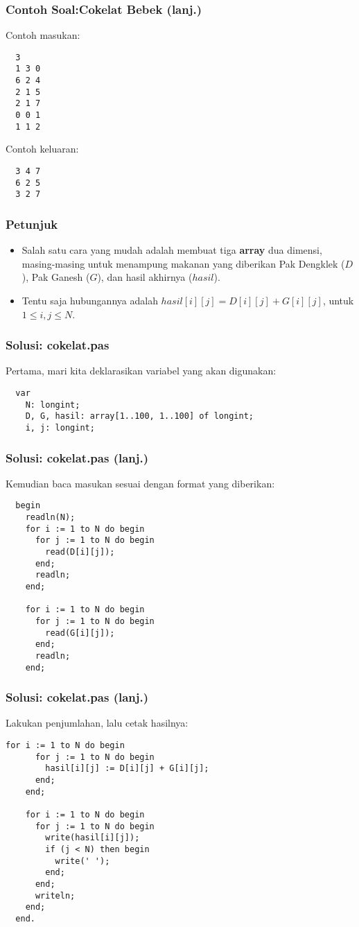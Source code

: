\begin{frame}[fragile]
\frametitle{Contoh Soal:\newline Cokelat Bebek (lanj.)}
Contoh masukan:
\begin{lstlisting}
  3
  1 3 0
  6 2 4
  2 1 5
  2 1 7
  0 0 1
  1 1 2
\end{lstlisting}
Contoh keluaran:
\begin{lstlisting}
  3 4 7
  6 2 5
  3 2 7
\end{lstlisting}
\end{frame}

\begin{frame}
\frametitle{Petunjuk}
\begin{itemize}
  \item Salah satu cara yang mudah adalah membuat tiga \textbf{array} dua dimensi, masing-masing untuk menampung makanan yang diberikan Pak Dengklek ($D$), Pak Ganesh ($G$), dan hasil akhirnya ($hasil$).
  \item Tentu saja hubungannya adalah $hasil[i][j] = D[i][j] + G[i][j]$, untuk $1 \le i,j \le N$.
\end{itemize}
\end{frame}

\begin{frame}[fragile]
\frametitle{Solusi: cokelat.pas}
Pertama, mari kita deklarasikan variabel yang akan digunakan:
\begin{lstlisting}
  var
    N: longint;
    D, G, hasil: array[1..100, 1..100] of longint;
    i, j: longint;
\end{lstlisting}
\end{frame}

\begin{frame}[fragile]
\frametitle{Solusi: cokelat.pas (lanj.)}
Kemudian baca masukan sesuai dengan format yang diberikan:
\begin{lstlisting}
  begin
    readln(N);
    for i := 1 to N do begin
      for j := 1 to N do begin
        read(D[i][j]);
      end;
      readln;
    end;

    for i := 1 to N do begin
      for j := 1 to N do begin
        read(G[i][j]);
      end;
      readln;
    end;
\end{lstlisting}
\end{frame}

\begin{frame}[fragile]
\frametitle{Solusi: cokelat.pas (lanj.)}
Lakukan penjumlahan, lalu cetak hasilnya:
\begin{lstlisting}[gobble=2]
    for i := 1 to N do begin
      for j := 1 to N do begin
        hasil[i][j] := D[i][j] + G[i][j];
      end;
    end;

    for i := 1 to N do begin
      for j := 1 to N do begin
        write(hasil[i][j]);
        if (j < N) then begin
          write(' ');
        end;
      end;
      writeln;
    end;
  end.
\end{lstlisting}
\end{frame}


